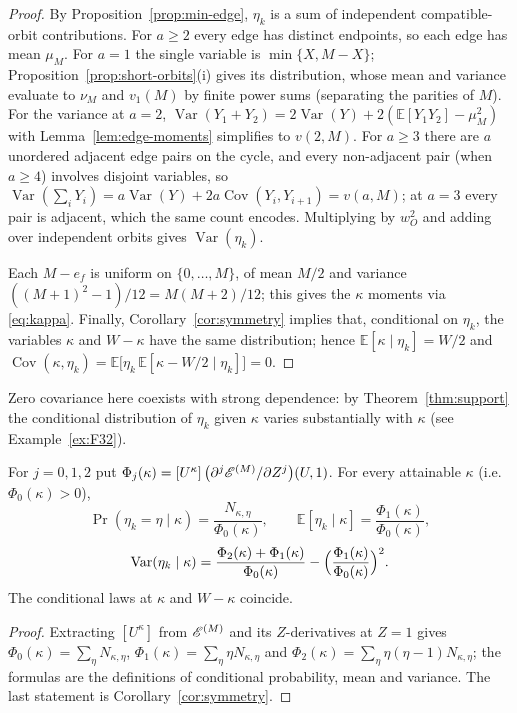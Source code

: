 \begin{proof}
By Proposition~\ref{prop:min-edge}, $\eta_k$ is a sum of independent
compatible-orbit contributions.  For $a\geq2$ every edge has distinct
endpoints, so each edge has mean $\mu_M$.  For $a=1$ the single variable is
$\min\{X,M-X\}$; Proposition~\ref{prop:short-orbits}(i) gives its distribution,
whose mean and variance evaluate to $\nu_M$ and $v_1(M)$ by finite power sums
(separating the parities of $M$).  For the variance at $a=2$,
$\operatorname{Var}(Y_1+Y_2)=2\operatorname{Var}(Y)
 +2(\mathbb{E}[Y_1Y_2]-\mu_M^2)$ with
Lemma~\ref{lem:edge-moments} simplifies to $v(2,M)$.  For $a\geq3$ there are
$a$ unordered adjacent edge pairs on the cycle, and every non-adjacent pair
(when $a\geq4$) involves disjoint variables, so
$\operatorname{Var}(\sum_iY_i)=a\operatorname{Var}(Y)
 +2a\operatorname{Cov}(Y_i,Y_{i+1})=v(a,M)$; at $a=3$ every pair is adjacent,
which the same count encodes.  Multiplying by $w_O^2$ and adding over
independent orbits gives $\operatorname{Var}(\eta_k)$.

Each $M-e_f$ is uniform on $\{0,\ldots,M\}$, of mean $M/2$ and variance
$((M+1)^2-1)/12=M(M+2)/12$; this gives the $\kappa$ moments via
\eqref{eq:kappa}.  Finally, Corollary~\ref{cor:symmetry} implies that,
conditional on $\eta_k$, the variables $\kappa$ and $W-\kappa$ have the same
distribution; hence $\mathbb{E}[\kappa\mid\eta_k]=W/2$ and
$\operatorname{Cov}(\kappa,\eta_k)
 =\mathbb{E}\bigl[\eta_k\,\mathbb{E}[\kappa-W/2\mid\eta_k]\bigr]=0$.
\end{proof}

Zero covariance here coexists with strong dependence: by
Theorem~\ref{thm:support} the conditional distribution of $\eta_k$ given
$\kappa$ varies substantially with $\kappa$ (see Example~\ref{ex:F32}).

\begin{proposition}\label{prop:conditional}
For $j=0,1,2$ put
$\Phi_j(\kappa)=[U^\kappa]\,
 \bigl(\partial^j\mathscr E^{(M)}/\partial Z^j\bigr)(U,1)$.
For every attainable $\kappa$ (i.e.\ $\Phi_0(\kappa)>0$),
\[
\Pr(\eta_k=\eta\mid\kappa)=\frac{N_{\kappa,\eta}}{\Phi_0(\kappa)},\qquad
\mathbb{E}[\eta_k\mid\kappa]=\frac{\Phi_1(\kappa)}{\Phi_0(\kappa)},
\]
\[
\operatorname{Var}(\eta_k\mid\kappa)
 =\frac{\Phi_2(\kappa)+\Phi_1(\kappa)}{\Phi_0(\kappa)}
  -\Bigl(\frac{\Phi_1(\kappa)}{\Phi_0(\kappa)}\Bigr)^2.
\]
The conditional laws at $\kappa$ and $W-\kappa$ coincide.
\end{proposition}

\begin{proof}
Extracting $[U^\kappa]$ from $\mathscr E^{(M)}$ and its $Z$-derivatives at $Z=1$
gives $\Phi_0(\kappa)=\sum_\eta N_{\kappa,\eta}$,
$\Phi_1(\kappa)=\sum_\eta\eta N_{\kappa,\eta}$ and
$\Phi_2(\kappa)=\sum_\eta\eta(\eta-1)N_{\kappa,\eta}$; the formulas are the
definitions of conditional probability, mean and variance.  The last statement
is Corollary~\ref{cor:symmetry}.
\end{proof}

